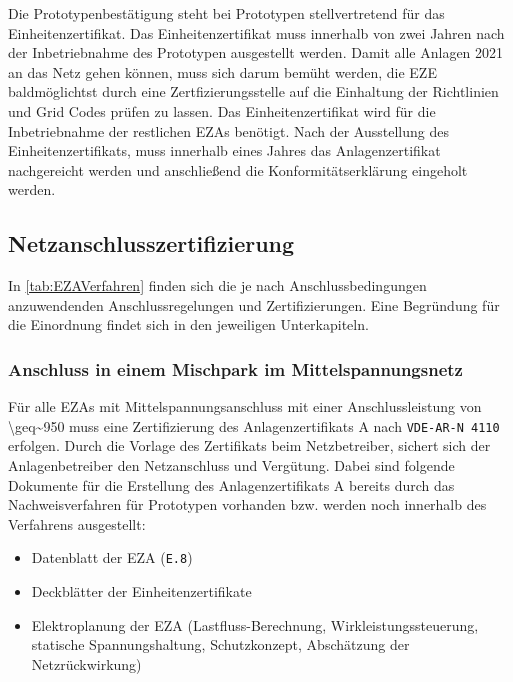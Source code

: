 Die Prototypenbestätigung steht bei Prototypen stellvertretend für das Einheitenzertifikat. Das Einheitenzertifikat muss innerhalb von zwei Jahren nach der Inbetriebnahme des Prototypen ausgestellt werden. Damit alle Anlagen \num{2021} an das Netz gehen können, muss sich darum bemüht werden, die \gls{EZE} baldmöglichtst durch eine Zertfizierungsstelle auf die Einhaltung der Richtlinien und Grid Codes prüfen zu lassen. Das Einheitenzertifikat wird für die Inbetriebnahme der restlichen \glspl{EZA} benötigt. Nach der Ausstellung des Einheitenzertifikats, muss innerhalb eines Jahres das Anlagenzertifikat nachgereicht werden und anschließend die Konformitätserklärung eingeholt werden. \cite{MOEGH2020}

\subsection{Netzanschlusszertifizierung}

In \autoref{tab:EZAVerfahren} finden sich die je nach Anschlussbedingungen anzuwendenden Anschlussregelungen und Zertifizierungen. Eine Begründung für die Einordnung findet sich in den jeweiligen Unterkapiteln.



\subsubsection{Anschluss in einem Mischpark im Mittelspannungsnetz}

Für alle \glspl{EZA} mit Mittelspannungsanschluss mit einer Anschlussleistung von \SI{\geq~950}{\kw} muss eine Zertifizierung des Anlagenzertifikats A nach \texttt{VDE-AR-N \num{4110}} erfolgen. Durch die Vorlage des Zertifikats beim Netzbetreiber, sichert sich der Anlagenbetreiber den Netzanschluss und Vergütung. Dabei sind folgende Dokumente für die Erstellung des Anlagenzertifikats A bereits durch das Nachweisverfahren für Prototypen vorhanden bzw. werden noch innerhalb des Verfahrens ausgestellt:

\begin{itemize}
	\item Datenblatt der \gls{EZA} (\texttt{E.8})
	\item Deckblätter der Einheitenzertifikate
	\item  Elektroplanung der \gls{EZA} (Lastfluss-Berechnung, Wirkleistungssteuerung, statische Spannungshaltung, Schutzkonzept, Abschätzung der Netzrückwirkung)
\end{itemize}

